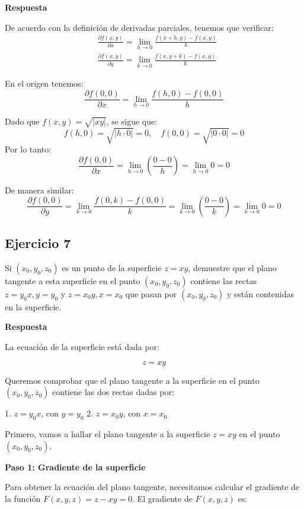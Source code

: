\documentclass{report}
\begin{document}
    \textbf{Respuesta}

    De acuerdo con la definición de derivadas parciales, tenemos que verificar:
    $$
    \begin{aligned}
    & \frac{\partial f(x, y)}{\partial x}=\lim _{h \rightarrow 0} \frac{f(x+h, y)-f(x, y)}{h} \\
    & \frac{\partial f(x, y)}{\partial y}=\lim _{k \rightarrow 0} \frac{f(x, y+k)-f(x, y)}{k}
    \end{aligned}
    $$

    En el origen tenemos:
    $$
    \frac{\partial f(0,0)}{\partial x}=\lim _{h \rightarrow 0} \frac{f(h, 0)-f(0,0)}{h}
    $$

    Dado que $f(x, y)=\sqrt{|x y|}$, se sigue que:
    $$
    f(h, 0)=\sqrt{|h \cdot 0|}=0, \quad f(0,0)=\sqrt{|0 \cdot 0|}=0
    $$
    Por lo tanto:
    $$
    \frac{\partial f(0,0)}{\partial x}=\lim _{h \rightarrow 0}\left(\frac{0-0}{h}\right)=\lim _{h \rightarrow 0} 0=0
    $$

    De manera similar:
    $$
    \frac{\partial f(0,0)}{\partial y}=\lim _{k \rightarrow 0} \frac{f(0, k)-f(0,0)}{k}=\lim _{k \rightarrow 0}\left(\frac{0-0}{k}\right)=\lim _{k \rightarrow 0} 0=0
    $$\subsection*{Ejercicio 7}
    Si $\left(x_{0}, y_{0}, z_{0}\right)$ es un punto de la superficie $z=xy$, demuestre que el plano tangente a esta superficie en el punto $(x_{0}, y_{0}, z_{0})$ contiene las rectas $z=y_{0}x, y=y_{0}$ y $z=x_{0}y, x=x_{0}$ que pasan por $\left(x_{0}, y_{0}, z_{0}\right)$ y están contenidas en la superficie.

    \textbf{Respuesta}

    La ecuación de la superficie está dada por:

    \[
    z = xy
    \]

    Queremos comprobar que el plano tangente a la superficie en el punto $(x_0, y_0, z_0)$ contiene las dos rectas dadas por:

    1. \( z = y_0 x \), con \( y = y_0 \)
    2. \( z = x_0 y \), con \( x = x_0 \)

    Primero, vamos a hallar el plano tangente a la superficie \( z = xy \) en el punto \( (x_0, y_0, z_0) \).

    \textbf{Paso 1: Gradiente de la superficie}

    Para obtener la ecuación del plano tangente, necesitamos calcular el gradiente de la función \( F(x, y, z) = z - xy = 0 \). El gradiente de \( F(x, y, z) \) es:
\end{document}
